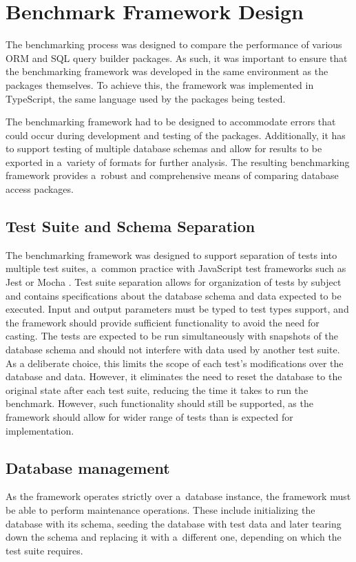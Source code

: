 \chapter{Benchmark Framework Design}\label{ch:benchmarkDesign}

The benchmarking process was designed to compare the performance of various ORM
and SQL query builder packages. As such, it was important to ensure that the
benchmarking framework was developed in the same environment as the packages
themselves. To achieve this, the framework was implemented in TypeScript, the
same language used by the packages being tested.

The benchmarking framework had to be designed to accommodate errors that could
occur during development and testing of the packages. Additionally, it has to
support testing of multiple database schemas and allow for results to be
exported in a~variety of formats for further analysis. The resulting
benchmarking framework provides a~robust and comprehensive means of comparing
database access packages.

\section{Test Suite and Schema Separation}

The benchmarking framework was designed to support separation of tests into
multiple test suites, a~common practice with JavaScript test frameworks such as
Jest \cite{Jest} or Mocha \cite{Mocha}. Test suite separation allows for
organization of tests by subject and contains specifications about the database
schema and data expected to be executed. Input and output parameters must be
typed to test types support, and the framework should provide sufficient
functionality to avoid the need for casting.
\newpage
The tests are expected to be run simultaneously with snapshots of the database
schema and should not interfere with data used by another test suite. As a
deliberate choice, this limits the scope of each test's modifications over the
database and data. However, it eliminates the need to reset the database to the
original state after each test suite, reducing the time it takes to run the
benchmark. However, such functionality should still be supported, as the
framework should allow for wider range of tests than is expected for
implementation.

\section{Database management}
As the framework operates strictly over a~database instance, the framework must
be able to perform maintenance operations. These include initializing the
database with its schema, seeding the database with test data and later tearing
down the schema and replacing it with a~different one, depending on which the
test suite requires.

